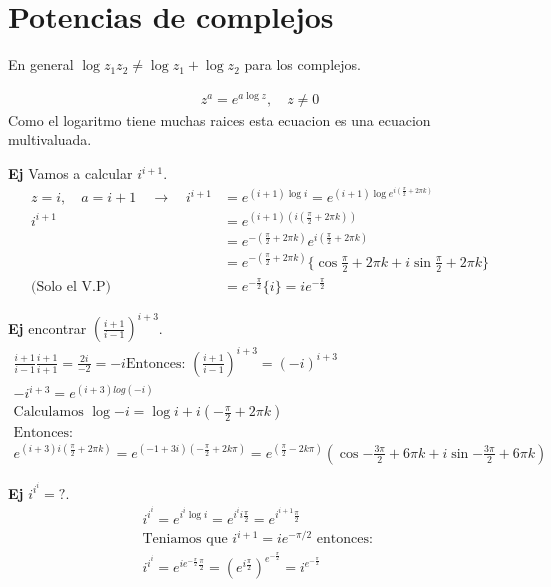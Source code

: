 \documentclass{article}
\newcommand{\caja}[3]{%
  \begin{tcolorbox}[colback=#1!5!white,colframe=#1!25!black,title=#2]
    #3
  \end{tcolorbox}%
}
\begin{document}
\section{Potencias de complejos }
En general $ \log{z_1z_2} \neq \log{z_1}+\log{z_2} $ para los complejos.

\caja{black}{}{
  \begin{gather*}
    z ^ {a } = e ^ {a \log z }, \quad z \neq 0 
  \end{gather*}
  Como el logaritmo tiene muchas raices esta ecuacion es una ecuacion multivaluada.
}

\textbf{Ej }Vamos a calcular $ i ^ {i+1 }$.
\begin{align*}
  z = i, \quad a = i+1 \quad \rightarrow \quad i ^ {i +1 } &= e ^ {(i+ 1) \log{i}}  = e ^ {(i+ 1) \log{e ^ {i(\frac{\pi}{2} + 2 \pi k )}}}\\
  i ^ {i + 1 } &= e ^ {(i+1 )\left(i \left(\frac{\pi }{2} + 2\pi k \right)\right)}\\
               & = e ^ {- \left(\frac{\pi}{2} + 2 \pi k \right)} e ^ {i \left(\frac{\pi}{2} + 2 \pi  k \right)}\\
               & = e ^ {- \left(\frac{\pi}{2} + 2 \pi k \right)}\{\cos{\frac{\pi }{2} + 2 \pi k } + i \sin{\frac{\pi }{2} + 2 \pi k } \}\\
  \text{(Solo el V.P) } &= e ^ {- \frac{\pi}{2}}\{i \} = i e ^ {- \frac{\pi}{2}}
\end{align*}

\textbf{Ej } encontrar $ \left(\frac{i + 1 }{i - 1 }\right)^ {i + 3 }$. 
\begin{gather*}
  \frac{i + 1 }{i - 1 }\frac{i + 1 }{i + 1 } = \frac{2 i }{- 2 } = -i   \text{Entonces: }\left(\frac{i + 1 }{i - 1 }\right)^ {i + 3 }  = (-i ) ^ {i + 3 }\\
  - i ^ {i + 3 } = e ^ {(i + 3 ) log(-i )}\\
  \text{Calculamos } \log {-i} = \log{i} + i \left(- \frac{\pi}{2} + 2 \pi k \right)\\
  \text{Entonces: }\\
  e ^ {(i + 3 ) i \left(\frac{\pi }{2} + 2 \pi k \right)} = e ^ {(- 1 + 3 i ) \left(-\frac{\pi}{2} + 2 k \pi \right)} = e ^ {\left(\frac{\pi}{2} - 2k \pi\right)}\left(\cos{- \frac{3 \pi }{2} + 6 \pi k } + i \sin{- \frac{3 \pi }{2 } + 6 \pi k }\right) 
\end{gather*}

\textbf{Ej } $ i ^ {i ^ {i }} = ?  $.
\begin{gather*}
  i ^ {i ^ {i }} = e ^ {i ^ {i } \log{i }} = e ^ { i ^ {i }i \frac{\pi}{2}}= e ^ {i ^ {i+1 } \frac{\pi}{2}} \\
  \text{Teniamos que } i ^ {i + 1 } = i e ^ {-\pi/2} \text{ entonces: }\\
  i ^ {i ^ {i }} = e ^ {i e ^ {- \frac{\pi }{2}}\frac{\pi}{2}} = \left(e ^ {i \frac{\pi}{2}}\right)^ {e ^ {- \frac{\pi}{2}}} =  i ^ {e ^ {- \frac{\pi}{2}}}
\end{gather*}
\end{document}
